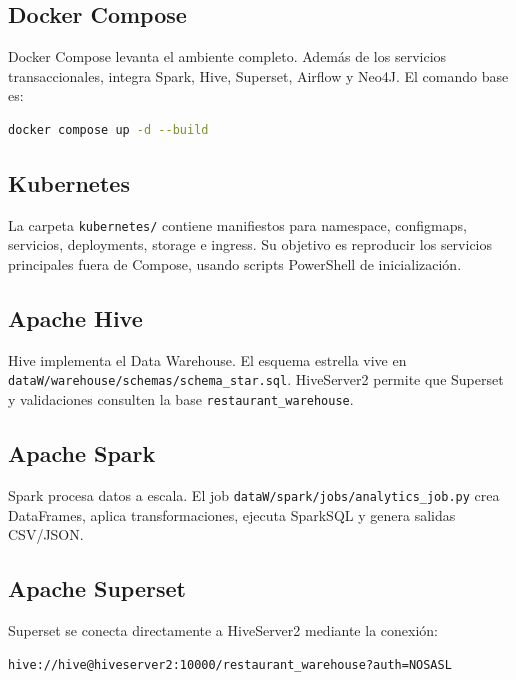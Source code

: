 \documentclass[12pt,letterpaper]{article}
\def\codefile#1{\nolinkurl{#1}}
\begin{document}
\subsection{Docker Compose}

Docker Compose levanta el ambiente completo. Además de los servicios transaccionales, integra Spark, Hive, Superset, Airflow y Neo4J. El comando base es:

\begin{lstlisting}[language=bash]
docker compose up -d --build
\end{lstlisting}

\subsection{Kubernetes}

La carpeta \codefile{kubernetes/} contiene manifiestos para namespace, configmaps, servicios, deployments, storage e ingress. Su objetivo es reproducir los servicios principales fuera de Compose, usando scripts PowerShell de inicialización.

\subsection{Apache Hive}

Hive implementa el Data Warehouse. El esquema estrella vive en \codefile{dataW/warehouse/schemas/schema\_star.sql}. HiveServer2 permite que Superset y validaciones consulten la base \codefile{restaurant\_warehouse}.

\subsection{Apache Spark}

Spark procesa datos a escala. El job \codefile{dataW/spark/jobs/analytics\_job.py} crea DataFrames, aplica transformaciones, ejecuta SparkSQL y genera salidas CSV/JSON.

\subsection{Apache Superset}

Superset se conecta directamente a HiveServer2 mediante la conexión:

\begin{lstlisting}
hive://hive@hiveserver2:10000/restaurant_warehouse?auth=NOSASL
\end{lstlisting}
\end{document}
